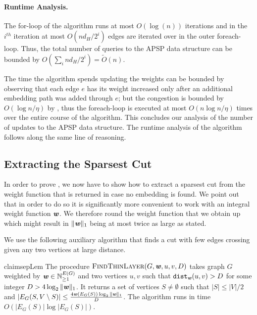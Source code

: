 \paragraph{Runtime Analysis.} The for-loop of the algorithm runs at most $O(\log (n))$ iterations and in the $i^{th}$ iteration at most $O(n d_H /2^i)$ edges are iterated over in the  outer foreach-loop. Thus, the total number of queries to the APSP data structure can be bounded by $O(\sum_i n d_H /2^i) = \tilde{O}(n)$. 

The time the algorithm spends updating the weights can be bounded by observing that each edge $e$ has its weight increased only after an additional embedding path was added through $e$; but the congestion is bounded by $O(\log n/\eta)$ by , thus the foreach-loop is executed at most $O(n\log n/\eta)$ times over the entire course of the algorithm. This concludes our analysis of the number of updates to the APSP data structure. The runtime analysis of the algorithm follows along the same line of reasoning.

\subsection{Extracting the Sparsest Cut}

In order to prove , we now have to show how to extract a sparsest cut from the weight function that is returned in case no embedding is found. We point out that in order to do so it is significantly more convenient to work with an integral weight function $\boldsymbol{\mathit{w}}$. We therefore round the weight function that we obtain  up which might result in $\|\boldsymbol{\mathit{w}}\|_1$ being at most twice as large as stated.

We use the following auxiliary algorithm that finds a cut with few edges crossing given any two vertices at large distance. 

\begin{restatable}{claim}{sepLem}\label{clm:thinLayer}
The procedure $\textsc{FindThinLayer}(G, \boldsymbol{{\mathit{w}}}, u, v, D)$ takes graph $G$ weighted by $\boldsymbol{{\mathit{w}}} \in \mathbb{N}_{\geq 1}^{E(G)}$ and two vertices $u,v$ such that $\operatorname{\mathtt{dist}}_{\boldsymbol{{\mathit{w}}}}(u,v) > D$ for some integer $D > 4 \log_2 \|\boldsymbol{{\mathit{w}}}\|_1$. It returns a set of vertices $S \neq \emptyset$ such that $|S| \leq |V|/2$ and $|E_G(S, V \setminus S)| \leq \frac{4  \boldsymbol{{\mathit{w}}}(E_G(S)) \log_2 \|\boldsymbol{{\mathit{w}}}\|_1 }{D}$. The algorithm runs in time $O(|E_G(S)| \log |E_G(S)|)$.
\end{restatable}

